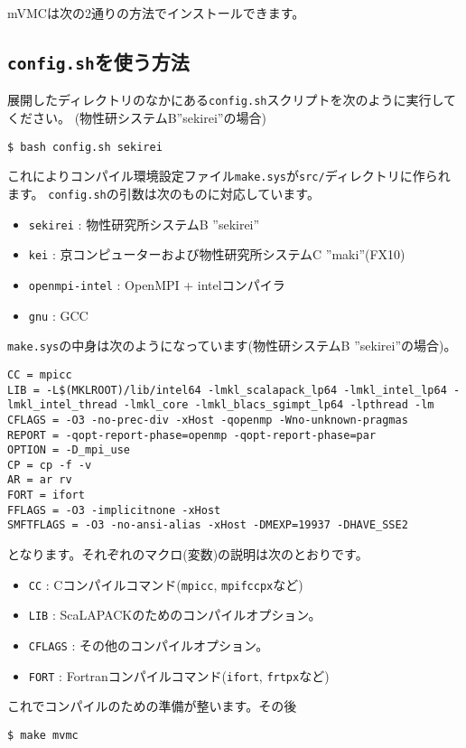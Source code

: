 mVMCは次の2通りの方法でインストールできます。

\subsection{\texttt{config.sh}を使う方法}

展開したディレクトリのなかにある\verb|config.sh|スクリプトを次のように実行してください。
(物性研システムB''sekirei''の場合)
\begin{verbatim}
$ bash config.sh sekirei
\end{verbatim}
これによりコンパイル環境設定ファイル\verb|make.sys|が\verb|src/|ディレクトリに作られます。
\verb|config.sh|の引数は次のものに対応しています。
\begin{itemize}
\item \verb|sekirei| : 物性研究所システムB ''sekirei''
\item \verb|kei| : 京コンピューターおよび物性研究所システムC ''maki''(FX10)
\item \verb|openmpi-intel| : OpenMPI + intelコンパイラ
\item \verb|gnu| : GCC
\end{itemize}

\verb|make.sys|の中身は次のようになっています(物性研システムB ''sekirei''の場合)。
\begin{verbatim}
CC = mpicc
LIB = -L$(MKLROOT)/lib/intel64 -lmkl_scalapack_lp64 -lmkl_intel_lp64 -lmkl_intel_thread -lmkl_core -lmkl_blacs_sgimpt_lp64 -lpthread -lm
CFLAGS = -O3 -no-prec-div -xHost -qopenmp -Wno-unknown-pragmas
REPORT = -qopt-report-phase=openmp -qopt-report-phase=par
OPTION = -D_mpi_use
CP = cp -f -v
AR = ar rv
FORT = ifort
FFLAGS = -O3 -implicitnone -xHost
SMFTFLAGS = -O3 -no-ansi-alias -xHost -DMEXP=19937 -DHAVE_SSE2
\end{verbatim}
となります。それぞれのマクロ(変数)の説明は次のとおりです。
\begin{itemize}
\item \verb|CC| : Cコンパイルコマンド(\verb|mpicc|, \verb|mpifccpx|など)
\item \verb|LIB| : ScaLAPACKのためのコンパイルオプション。
\item \verb|CFLAGS| : その他のコンパイルオプション。
\item \verb|FORT| : Fortranコンパイルコマンド(\verb|ifort|, \verb|frtpx|など)
\end{itemize}

これでコンパイルのための準備が整います。その後
\begin{verbatim}
$ make mvmc
\end{verbatim}

